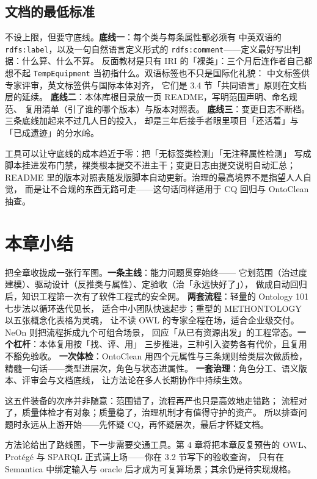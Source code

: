 \subsection{文档的最低标准}

不设上限，但要守底线。\textbf{底线一}：每个类与每条属性都必须有
中英双语的 \texttt{rdfs:label}，以及一句自然语言定义形式的
\texttt{rdfs:comment}——定义最好写出判据：什么算、什么不算。
反面教材是只有 IRI 的「裸类」：三个月后连作者自己都想不起
\texttt{TempEquipment} 当初指什么。双语标签也不只是国际化礼貌：
中文标签供专家评审，英文标签供与国际本体对齐，
它们是 3.4 节「共同语言」原则在文档层的延续。
\textbf{底线二}：本体库根目录放一页 README，写明范围声明、命名规范、
复用清单（引了谁的哪个版本）与版本对照表。
\textbf{底线三}：变更日志不断档。三条底线加起来不过几人日的投入，
却是三年后接手者眼里项目「还活着」与「已成遗迹」的分水岭。

工具可以让守底线的成本趋近于零：把「无标签类检测」「无注释属性检测」
写成脚本挂进发布门禁，裸类根本提交不进主干；变更日志由提交说明自动汇总；
README 里的版本对照表随发版脚本自动更新。治理的最高境界不是指望人人自觉，
而是让不合规的东西无路可走——这句话同样适用于 CQ 回归与 OntoClean 抽查。

\section{本章小结}

把全章收拢成一张行军图。\textbf{一条主线}：能力问题贯穿始终——
它划范围（治过度建模）、驱动设计（反推类与属性）、定验收（治「永远快好了」），
做成自动回归后，知识工程第一次有了软件工程式的安全网。
\textbf{两套流程}：轻量的 Ontology 101 七步法以循环迭代见长，
适合中小团队快速起步；重型的 METHONTOLOGY 以五张概念化表格为灵魂，
让不读 OWL 的专家全程在场，适合企业级交付。NeOn 则把流程拆成九个可组合场景，
回应「从已有资源出发」的工程常态。\textbf{一个杠杆}：本体复用按「找、评、用」
三步推进，三种引入姿势各有代价，且复用不豁免验收。
\textbf{一次体检}：OntoClean 用四个元属性与三条规则给类层次做质检，
精髓一句话——类型进层次，角色与状态进属性。
\textbf{一套治理}：角色分工、语义版本、评审会与文档底线，
让方法论在多人长期协作中持续生效。

这五件装备的次序并非随意：范围错了，流程再严也只是高效地走错路；
流程对了，质量体检才有对象；质量稳了，治理机制才有值得守护的资产。
所以排查问题时永远从上游开始——先怀疑 CQ，再怀疑层次，最后才怀疑文档。

方法论给出了路线图，下一步需要交通工具。第 4 章将把本章反复预告的
OWL、Protégé 与 SPARQL 正式请上场——你在 3.2 节写下的验收查询，
只有在 Semantica 中绑定输入与 oracle 后才成为可复算场景；其余仍是待实现规格。

